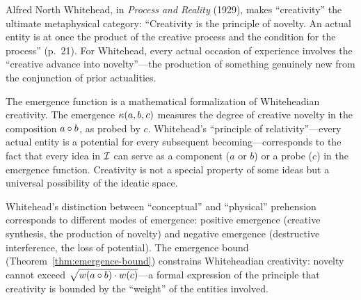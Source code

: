 \begin{interpretation}\label{interp:ch5:whitehead_creativity}
Alfred North Whitehead, in \emph{Process and Reality} (1929), makes
``creativity'' the ultimate metaphysical category: ``Creativity is the
principle of novelty. An actual entity is at once the product of the
creative process and the condition for the process'' (p.~21). For
Whitehead, every actual occasion of experience involves the ``creative
advance into novelty''---the production of something genuinely new
from the conjunction of prior actualities.

The emergence function is a mathematical formalization of Whiteheadian
creativity. The emergence $\kappa(a, b, c)$ measures the degree of
creative novelty in the composition $a \circ b$, as probed by $c$.
Whitehead's ``principle of relativity''---every actual entity is a
potential for every subsequent becoming---corresponds to the fact that
every idea in $\mathcal{I}$ can serve as a component ($a$ or $b$) or a probe
($c$) in the emergence function. Creativity is not a special property
of some ideas but a universal possibility of the ideatic space.

Whitehead's distinction between ``conceptual'' and ``physical'' prehension
corresponds to different modes of emergence: positive emergence (creative
synthesis, the production of novelty) and negative emergence (destructive
interference, the loss of potential). The emergence bound
(Theorem~\ref{thm:emergence-bound}) constrains Whiteheadian creativity:
novelty cannot exceed $\sqrt{w(a \circ b) \cdot w(c)}$---a formal
expression of the principle that creativity is bounded by the ``weight''
of the entities involved.
\end{interpretation}


